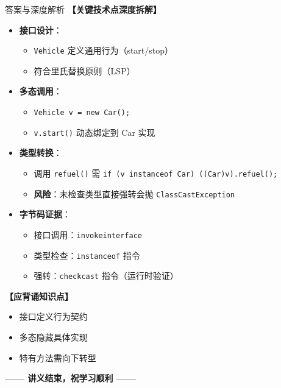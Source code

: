 \documentclass[12pt, a4paper]{ctexart}
\newcommand{\code}[1]{\texttt{#1}}
\begin{document}
\begin{enumerate}[label=\textbf{\arabic*.}, leftmargin=*, itemsep=1.5em]
\begin{bluebox}{答案与深度解析}
		      \textbf{【关键技术点深度拆解】}
		      \begin{itemize}[leftmargin=*, nosep]
			      \item \textbf{接口设计}：
			            \begin{itemize}
				            \item \code{Vehicle} 定义通用行为（start/stop）
				            \item 符合里氏替换原则（LSP）
			            \end{itemize}
			      \item \textbf{多态调用}：
			            \begin{itemize}
				            \item \code{Vehicle v = new Car();}
				            \item \code{v.start()} 动态绑定到 Car 实现
			            \end{itemize}
			      \item \textbf{类型转换}：
			            \begin{itemize}
				            \item 调用 \code{refuel()} 需 \code{if (v instanceof Car) ((Car)v).refuel();}
				            \item \textbf{风险}：未检查类型直接强转会抛 \code{ClassCastException}
			            \end{itemize}
			      \item \textbf{字节码证据}：
			            \begin{itemize}
				            \item 接口调用：\code{invokeinterface}
				            \item 类型检查：\code{instanceof} 指令
				            \item 强转：\code{checkcast} 指令（运行时验证）
			            \end{itemize}
		      \end{itemize}

		      \textbf{【应背诵知识点】}
		      \begin{itemize}[leftmargin=*, nosep]
			      \item 接口定义行为契约
			      \item 多态隐藏具体实现
			      \item 特有方法需向下转型
		      \end{itemize}
	      \end{bluebox}
\end{enumerate}

\vfill
\begin{center}
	\bfseries —— 讲义结束，祝学习顺利 ——
\end{center}
\end{document}
